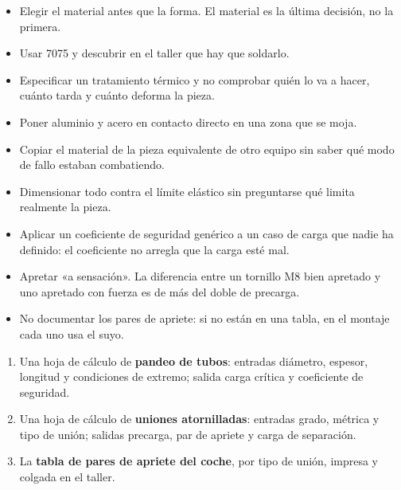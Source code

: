 \begin{ojo}
\begin{itemize}
  \item Elegir el material antes que la forma. El material es la última decisión,
        no la primera.
  \item Usar 7075 y descubrir en el taller que hay que soldarlo.
  \item Especificar un tratamiento térmico y no comprobar quién lo va a hacer,
        cuánto tarda y cuánto deforma la pieza.
  \item Poner aluminio y acero en contacto directo en una zona que se moja.
  \item Copiar el material de la pieza equivalente de otro equipo sin saber qué
        modo de fallo estaban combatiendo.
\end{itemize}
\end{ojo}


\begin{caso}
\end{caso}

\begin{ojo}
\begin{itemize}
  \item Dimensionar todo contra el límite elástico sin preguntarse qué limita
        realmente la pieza.
  \item Aplicar un coeficiente de seguridad genérico a un caso de carga que nadie
        ha definido: el coeficiente no arregla que la carga esté mal.
  \item Apretar «a sensación». La diferencia entre un tornillo M8 bien apretado y
        uno apretado con fuerza es de más del doble de precarga.
  \item No documentar los pares de apriete: si no están en una tabla, en el
        montaje cada uno usa el suyo.
\end{itemize}
\end{ojo}

\begin{entregable}
\begin{enumerate}
  \item Una hoja de cálculo de \textbf{pandeo de tubos}: entradas diámetro,
        espesor, longitud y condiciones de extremo; salida carga crítica y
        coeficiente de seguridad.
  \item Una hoja de cálculo de \textbf{uniones atornilladas}: entradas grado,
        métrica y tipo de unión; salidas precarga, par de apriete y carga de
        separación.
  \item La \textbf{tabla de pares de apriete del coche}, por tipo de unión,
        impresa y colgada en el taller.
\end{enumerate}
\end{entregable}

